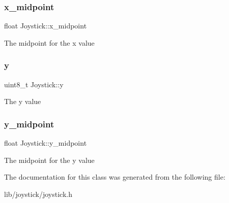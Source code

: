 \subsubsection{\texorpdfstring{x\+\_\+midpoint}{x\_midpoint}}
{\footnotesize\ttfamily float Joystick\+::x\+\_\+midpoint\hspace{0.3cm}{\ttfamily [private]}}

The midpoint for the x value \hypertarget{class_joystick_a691b70ed215adf414e0ab4edba5407a2}{}\label{class_joystick_a691b70ed215adf414e0ab4edba5407a2} 
\subsubsection{\texorpdfstring{y}{y}}
{\footnotesize\ttfamily uint8\+\_\+t Joystick\+::y\hspace{0.3cm}{\ttfamily [private]}}

The y value \hypertarget{class_joystick_a06e00f03f6dd0859663a7a01ada1d3c1}{}\label{class_joystick_a06e00f03f6dd0859663a7a01ada1d3c1} 
\subsubsection{\texorpdfstring{y\+\_\+midpoint}{y\_midpoint}}
{\footnotesize\ttfamily float Joystick\+::y\+\_\+midpoint\hspace{0.3cm}{\ttfamily [private]}}

The midpoint for the y value 

The documentation for this class was generated from the following file\+:\begin{DoxyCompactItemize}
\item 
lib/joystick/joystick.\+h\end{DoxyCompactItemize}
